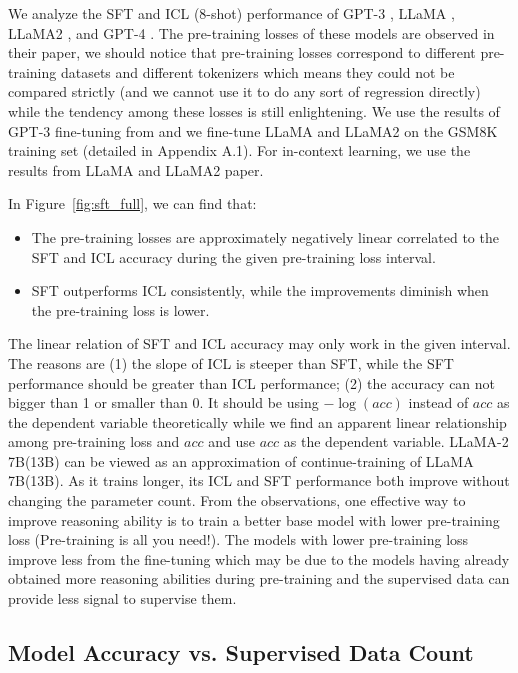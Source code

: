 We analyze the SFT and ICL (8-shot) performance of GPT-3 \citep{gpt3}, LLaMA \citep{llama}, LLaMA2 \citep{llama2}, and GPT-4 \citep{gpt4}. The pre-training losses of these models are observed in their paper, we should notice that pre-training losses correspond to different pre-training datasets and different tokenizers which means they could not be compared strictly (and we cannot use it to do any sort of regression directly) while the tendency among these losses is still enlightening. We use the results of GPT-3 fine-tuning from \citep{gsm8k} and we fine-tune LLaMA and LLaMA2 on the GSM8K training set (detailed in Appendix A.1). For in-context learning, we use the results from LLaMA \citep{llama} and LLaMA2 \citep{llama2} paper.

In Figure~\ref{fig:sft_full}, we can find that:

\begin{itemize}
    \item The pre-training losses are approximately negatively linear correlated to the SFT and ICL accuracy during the given pre-training loss interval. 
    \item SFT outperforms ICL consistently, while the improvements diminish when the pre-training loss is lower.
\end{itemize}

The linear relation of SFT and ICL accuracy may only work in the given interval. The reasons are (1) the slope of ICL is steeper than SFT, while the SFT performance should be greater than ICL performance; (2) the accuracy can not bigger than 1 or smaller than 0. It should be using $-\log(acc)$ instead of $acc$ as the dependent variable theoretically while we find an apparent linear relationship among pre-training loss and $acc$ and use $acc$ as the dependent variable. LLaMA-2 7B(13B) can be viewed as an approximation of continue-training of LLaMA 7B(13B). As it trains longer, its ICL and SFT performance both improve without changing the parameter count. From the observations, one effective way to improve reasoning ability is to train a better base model with lower pre-training loss (Pre-training is all you need!). The models with lower pre-training loss improve less from the fine-tuning which may be due to the models having already obtained more reasoning abilities during pre-training and the supervised data can provide less signal to supervise them.

\subsection{Model Accuracy vs. Supervised Data Count}

